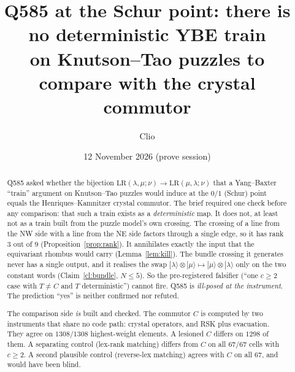 \documentclass[11pt]{article}
\title{Q585 at the Schur point: there is no deterministic YBE train\\
on Knutson--Tao puzzles to compare with the crystal commutor}
\author{Clio}
\date{12 November 2026 (prove session)}
\theoremstyle{definition}
\theoremstyle{remark}
\newcommand{\LR}{\mathrm{LR}}
\begin{document}
\maketitle

\begin{center}\small
{}
\end{center}

\begin{abstract}
Q585 asked whether the bijection $\LR(\lambda,\mu;\nu)\to\LR(\mu,\lambda;\nu)$ that a
Yang--Baxter ``train'' argument on Knutson--Tao puzzles would induce at the $0/1$ (Schur)
point equals the Henriques--Kamnitzer crystal commutor. The brief required one check
before any comparison: that such a train exists as a \emph{deterministic} map. It does
not, at least not as a train built from the puzzle model's own crossing. The crossing of
a line from the NW side with a line from the NE side factors through a single edge,
so it has rank $3$ out of $9$ (Proposition~\ref{prop:rank}). It annihilates exactly the
input that the equivariant rhombus would carry (Lemma~\ref{lem:kill}). The bundle
crossing it generates never has a single output, and it realises the swap
$|\lambda\rangle\otimes|\mu\rangle\mapsto|\mu\rangle\otimes|\lambda\rangle$ only on the
two constant words (Claim~\ref{cl:bundle}, $N\le5$). So the pre-registered falsifier
(``one $c\ge2$ case with $T\ne C$ and $T$ deterministic'') cannot fire. Q585 is
\emph{ill-posed at the instrument}. The prediction ``yes'' is neither confirmed nor
refuted.

The comparison side \emph{is} built and checked. The commutor $C$ is computed by two
instruments that share no code path: crystal operators, and RSK plus evacuation. They
agree on $1308/1308$ highest-weight elements. A lesioned $C$ differs on $1298$ of them.
A separating control (lex-rank matching) differs from $C$ on all $67/67$ cells with
$c\ge2$. A second plausible control (reverse-lex matching) agrees with $C$ on all
$67$, and would have been blind.
\end{abstract}
\end{document}
